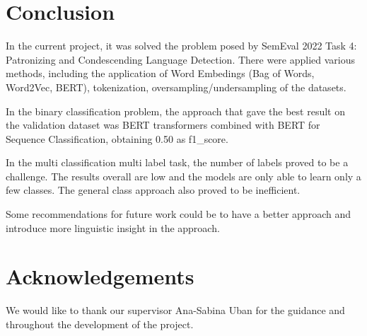\documentclass[11pt]{article}
\begin{document}
\begin{enumerate}
\begin{enumerate}
	      \end{enumerate}
\end{enumerate}


\section{Conclusion}

In the current project, it was solved the problem posed by SemEval 2022 Task
4: Patronizing and Condescending Language Detection. There were applied
various methods, including the application of Word Embedings (Bag of Words,
Word2Vec, BERT), tokenization, oversampling/undersampling of the datasets.

In the binary classification problem, the approach that gave the best result
on the validation dataset was BERT transformers combined with BERT for
Sequence Classification, obtaining 0.50 as f1\_score.

In the multi classification multi label task, the number of labels proved to
be a challenge. The results overall are low and the models are only able to learn
only a few classes. The general class approach also proved to be inefficient.

Some recommendations for future work could be to have a better approach and introduce
more linguistic insight in the approach.

\section*{Acknowledgements}

We would like to thank our supervisor Ana-Sabina Uban for the guidance and throughout
the development of the project.





\end{document}
